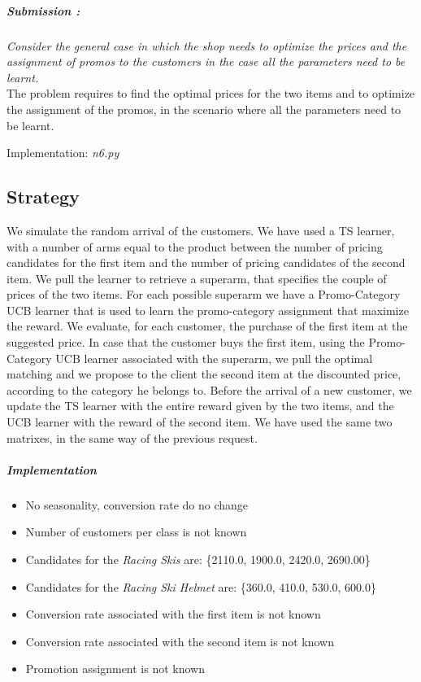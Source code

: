 \subparagraph*{Submission : }
\textit{Consider the general case in which the shop needs to optimize the prices and the assignment of promos to the customers in the case all the parameters need to be learnt.}\\

The problem requires to find the optimal prices for the two items and to optimize the assignment of the promos, in the scenario where all the parameters need to be learnt.

Implementation: \textit{n6.py}
\subsection*{Strategy}
We simulate the random arrival of the customers. We have used a TS learner, with a number of arms equal to the product between the number of pricing candidates for the first item and the number of pricing candidates of the second item. We pull the learner to retrieve a superarm, that specifies the couple of prices of the two items. For each possible superarm we have a Promo-Category UCB learner that is used to learn the promo-category assignment that maximize the reward.  We evaluate, for each customer, the purchase of the first item at the suggested price. In case that the customer buys the first item, using the Promo-Category UCB learner associated with the superarm, we pull the optimal matching and we propose to the client the second item at the discounted price, according to the category he belongs to. Before the arrival of a new customer, we update the TS learner with the entire reward given by the two items, and the UCB learner with the reward of the second item. We have used the same two matrixes, in the same way of the previous request.

\subparagraph{Implementation} 
\begin{itemize}
	\item No seasonality, conversion rate do no change
	\item Number of customers per class is not known 
	\item Candidates for the \textit{Racing Skis} are: \{2110.0, 1900.0, 2420.0, 2690.00\}
	\item Candidates for the \textit{Racing Ski Helmet} are: \{360.0, 410.0, 530.0, 600.0\}
	\item Conversion rate associated with the first item is not known
	\item Conversion rate associated with the second item is not known
	\item Promotion assignment is not known 
\end{itemize}


